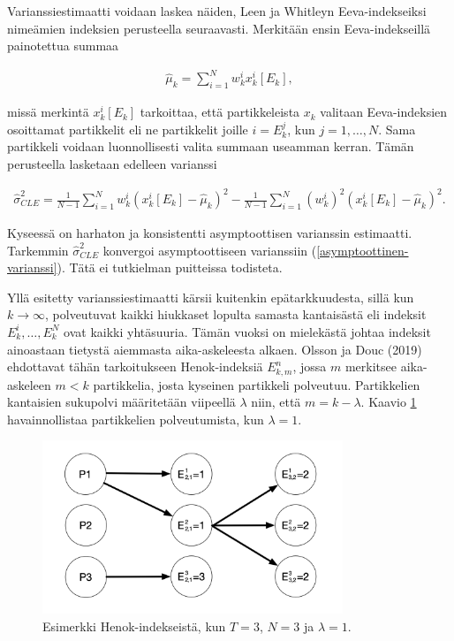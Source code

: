\documentclass[
  12pt,
  a4paper, twoside]{book}
\begin{document}
Varianssiestimaatti voidaan laskea näiden, Leen ja Whitleyn Eeva-indekseiksi nimeämien indeksien perusteella seuraavasti. Merkitään ensin Eeva-indekseillä painotettua summaa

\begin{align}\label{CLE-sum}
\hat{\mu}_k=\sum_{i=1}^N w_k^i x_k^i[E_k]
,\end{align}

\noindent missä merkintä \(x_k^i[E_k]\) tarkoittaa, että partikkeleista \(x_k\) valitaan Eeva-indeksien osoittamat partikkelit eli ne partikkelit joille \(i=E_k^j\), kun \(j=1,\ldots,N\). Sama partikkeli voidaan luonnollisesti valita summaan useamman kerran. Tämän perusteella lasketaan edelleen varianssi

\begin{align}\label{CLE-varianssi}
\hat{\sigma}^2_{CLE} = \frac{1}{N-1} \sum_{i=1}^N w_k^i (x_k^i[E_k]-\hat{\mu}_k)^2 - \frac{1}{N-1} \sum_{i=1}^N (w_k^i)^2 (x_k^i[E_k]-\hat{\mu}_k)^2
.\end{align}

\noindent Kyseessä on harhaton ja konsistentti asymptoottisen varianssin estimaatti. Tarkemmin \(\hat{\sigma}^2_{CLE}\) konvergoi asymptoottiseen varianssiin (\ref{asymptoottinen-varianssi}). Tätä ei tutkielman puitteissa todisteta.

Yllä esitetty varianssiestimaatti kärsii kuitenkin epätarkkuudesta, sillä kun \(k \to \infty\), polveutuvat kaikki hiukkaset lopulta samasta kantaisästä eli indeksit \(E_k^i,\ldots,E_k^N\) ovat kaikki yhtäsuuria. Tämän vuoksi on mielekästä johtaa indeksit ainoastaan tietystä aiemmasta aika-askeleesta alkaen. Olsson ja Douc (2019) \citep{olsson-2019} ehdottavat tähän tarkoitukseen Henok-indeksiä \(E_{k,m}^n\), jossa \(m\) merkitsee aika-askeleen \(m<k\) partikkelia, josta kyseinen partikkeli polveutuu. Partikkelien kantaisien sukupolvi määritetään viipeellä \(\lambda\) niin, että \(m=k-\lambda\). Kaavio \ref{fig:henok-indeksit} havainnollistaa partikkelien polveutumista, kun \(\lambda=1\).

\begin{figure}[H]
\centering
\includegraphics[width=9cm]{henokindeksit}
\caption{Esimerkki Henok-indekseistä, kun $T=3$, $N=3$ ja $\lambda=1$.}
\label{fig:henok-indeksit}
\end{figure}
\end{document}
